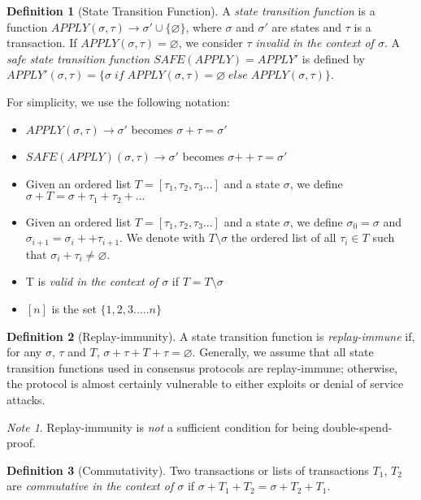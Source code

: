 \documentclass[11pt,a4paper]{report}
\theoremstyle{plain}
\theoremstyle{definition}
\newtheorem{defn}{Definition}[chapter]
\theoremstyle{remark}
\newtheorem*{note}{Note}
\begin{document}
\begin{defn}[State Transition Function]
A \emph{state transition function} is a function $APPLY(\sigma, \tau) \rightarrow \sigma' \cup \{\varnothing\}$, where $\sigma$ and $\sigma'$ are states and $\tau$ is a transaction. If $APPLY(\sigma, \tau) = \varnothing$, we consider $\tau$ \emph{invalid in the context of $\sigma$}. A \emph{safe state transition function} $SAFE(APPLY) = APPLY'$ is defined by $APPLY'(\sigma, \tau) = \{\sigma \; if \; APPLY(\sigma, \tau) = \varnothing \; else \; APPLY(\sigma, \tau)\}$.
\end{defn}

For simplicity, we use the following notation:

\begin{itemize}
\item
$APPLY(\sigma, \tau) \rightarrow \sigma'$ becomes $\sigma + \tau = \sigma'$
\item
$SAFE(APPLY)(\sigma, \tau) \rightarrow \sigma'$ becomes $\sigma {++} \tau = \sigma'$
\item
Given an ordered list $T = [\tau_1, \tau_2, \tau_3...]$ and a state $\sigma$, we define $\sigma + T = \sigma + \tau_1 + \tau_2 + ...$
\item
Given an ordered list $T = [\tau_1, \tau_2, \tau_3...]$ and a state $\sigma$, we define $\sigma_0 = \sigma$ and $\sigma_{i+1} = \sigma_i ++ \tau_{i+1}$. We denote with $T \setminus \sigma$ the ordered list of all $\tau_i \in T$ such that $\sigma_i + \tau_i \ne \varnothing$.
\item
T is \emph{valid in the context of $\sigma$} if $T = T \setminus \sigma$
\item
$[n]$ is the set $\{1, 2, 3..... n\}$
\end{itemize}

\begin{defn}[Replay-immunity]
A state transition function is \emph{replay-immune} if, for any $\sigma$, $\tau$ and $T$, $\sigma + \tau + T + \tau = \varnothing$. Generally, we assume that all state transition functions used in consensus protocols are replay-immune; otherwise, the protocol is almost certainly vulnerable to either exploits or denial of service attacks.
\end{defn}

\begin{note}
Replay-immunity is \emph{not} a sufficient condition for being double-spend-proof.
\end{note}

\begin{defn}[Commutativity]
Two transactions or lists of transactions $T_1$, $T_2$ are \emph{commutative in the context of $\sigma$} if $\sigma + T_1 + T_2 = \sigma + T_2 + T_1$.
\end{defn}
\end{document}
